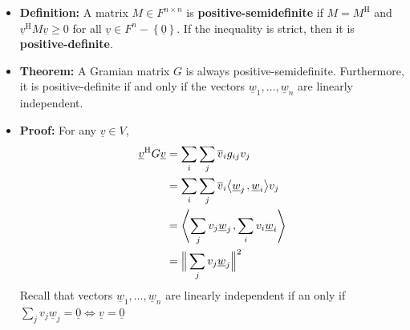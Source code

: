 \documentclass[11pt,twoside]{report}
\newcommand{\vecnot}{\underline}
\newcommand{\Herm}{{\mathrm{H}}}
\newcommand{\inner}[2]{{\left\langle #1 \mskip2mu , #2 \right\rangle}}
\begin{document}
\begin{itemize}
%
%


\item \textbf{Definition:}  A matrix $M\in F^{n \times n}$ is \textbf{positive-semidefinite} if $M=M^\Herm$ and $\vecnot{v}^\Herm M \vecnot{v} \geq 0$ for all $\vecnot{v} \in F^n - \left\{ \vecnot{0} \right\}$.
If the inequality is strict, then it is \textbf{positive-definite}.


\item \textbf{Theorem:}
A Gramian matrix $G$ is always positive-semidefinite. Furthermore, it is positive-definite if and only if the vectors $\vecnot{w}_1, \ldots, \vecnot{w}_n$ are linearly independent.

\item \textbf{Proof:} 
For any $\vecnot{v}\in V$, 
\begin{align*}
\vecnot{v}^\Herm G \vecnot{v} & = \sum_i \sum_j \overline{ v}_i g_{ij} v_j \\
& = \sum_i \sum_j \overline{ v}_i  \inner{ \vecnot{w}_j}{ \vecnot{w}_i   }  v_j \\
&=  \inner{ \sum_j v_j \vecnot{w}_j  }{  \sum_i  v_i \vecnot{w}_i    } \\
& = \Big \| \sum_j v_j \vecnot{w}_j \Big\|^2
\end{align*}
Recall that vectors $\vecnot{w}_1, \ldots, \vecnot{w}_n$ are linearly independent if an only if $\sum_j v_j \vecnot{w}_j =  \vecnot{0}  \iff \vecnot{v} = \vecnot{0}$
 

\end{itemize}
\end{document}
